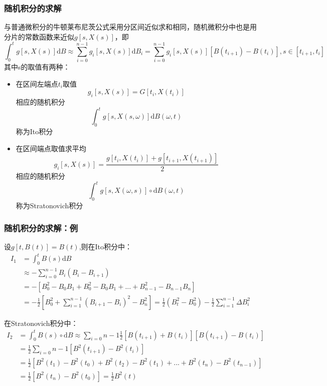 \documentclass{beamer}
\begin{document}
\begin{frame}

\frametitle{随机积分的求解}
\footnotesize  

与普通微积分的牛顿莱布尼茨公式采用分区间近似求和相同，随机微积分中也是用分片的常数函数来近似$g[s,X(s)]$，即$$\int_0^tg[s,X(s)]\mathrm{d}B \approx \sum_{i=0}^{n-1}g_i[s,X(s)]\mathrm{d}B_i = \sum_{i=0}^{n-1}g_i[s,X(s)][B(t_{i+1})-B(t_i)], s \in [t_{i+1},t_i]$$
其中s的取值有两种：

\begin{itemize}

\item 在区间左端点$t_i$取值$$g_i[s,X(s)]=G[t_i,X(t_i)]$$
相应的随机积分$$\int_0^t g[s,X(s,\omega)]\mathrm{d}B(\omega,t)$$
称为Ito积分

\item 在区间端点取值求平均$$g_i[s,X(s)]=\frac{g[t_i,X(t_i)]+g[t_{i+1},X(t_{i+1})]}{2}$$
相应的随机积分$$\int_0^t g[s,X(\omega,s)]∘\mathrm{d}B(\omega,t)$$
称为Stratonovich积分

\end{itemize}

\end{frame}

\begin{frame}

\frametitle{随机积分的求解：例}
\footnotesize
设$g[t,B(t)]=B(t)$,则在Ito积分中：
\begin{align}
I_1 &= \int_0^t B(s)\mathrm{d}B \\ 
&\approx -\sum_{i=0}^{n-1}B_i(B_i-B_{i+1}) \\
&=-[B_0^2-B_0B_1+B_0^2-B_0B_1+...+B_{n-1}^2-B_{n-1}B_n] \\
&=-\frac{1}{2}[B_0^2+\sum_{i=1}^{n-1}(B_{i+1}-B_i)^2-B_n^2]=\frac{1}{2}(B_t^2-B_0^2)-\frac{1}{2}\sum_{i=1}^{n-1}\Delta B_i^2
\end{align}

在Stratonovich积分中：
\begin{align}
I_2 &= \int_0^t B(s)∘\mathrm{d}B \approx \sum_{i=0}{n-1}\frac{1}{2}[B(t_{i+1})+B(t_i)][B(t_{i+1})-B(t_i)]\\
&= \frac{1}{2}\sum_{i=0}{n-1}[B^2(t_{i+1})-B^2(t_i)]\\
&= \frac{1}{2}[B^2(t_1)-B^2(t_0)+B^2(t_2)-B^2(t_1)+...+B^2(t_n)-B^2(t_{n-1})]\\
&= \frac{1}{2}[B^2(t_n)-B^2(t_0)] = \frac{1}{2}B^2(t)
\end{align}

\end{frame}
\end{document}
